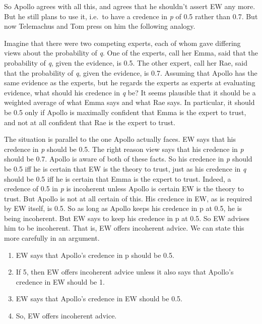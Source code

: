 \documentclass[
  10pt,
  letterpaper,
  DIV=11,
  numbers=noendperiod,
  twoside]{scrartcl}
\providecommand{\tightlist}{%
  \setlength{\itemsep}{0pt}\setlength{\parskip}{0pt}}\usepackage{longtable,booktabs,array}
\begin{document}
So Apollo agrees with all this, and agrees that he shouldn't assert EW
any more. But he still plans to use it, i.e.~to have a credence in
\emph{p} of 0.5 rather than 0.7. But now Telemachus and Tom press on him
the following analogy.

Imagine that there were two competing experts, each of whom gave
differing views about the probability of \emph{q}. One of the experts,
call her Emma, said that the probability of \emph{q}, given the
evidence, is 0.5. The other expert, call her Rae, said that the
probability of \emph{q}, given the evidence, is 0.7. Assuming that
Apollo has the same evidence as the experts, but he regards the experts
as experts at evaluating evidence, what should his credence in \emph{q}
be? It seems plausible that it should be a weighted average of what Emma
says and what Rae says. In particular, it should be 0.5 only if Apollo
is maximally confident that Emma is the expert to trust, and not at all
confident that Rae is the expert to trust.

The situation is parallel to the one Apollo actually faces. EW says that
his credence in \emph{p} should be 0.5. The right reason view says that
his credence in \emph{p} should be 0.7. Apollo is aware of both of these
facts. So his credence in \emph{p} should be 0.5 iff he is certain that
EW is the theory to trust, just as his credence in \emph{q} should be
0.5 iff he is certain that Emma is the expert to trust. Indeed, a
credence of 0.5 in \emph{p} is incoherent unless Apollo is certain EW is
the theory to trust. But Apollo is not at all certain of this. His
credence in EW, as is required by EW itself, is 0.5. So as long as
Apollo keeps his credence in p at 0.5, he is being incoherent. But EW
says to keep his credence in p at 0.5. So EW advises him to be
incoherent. That is, EW offers incoherent advice. We can state this more
carefully in an argument.

\begin{enumerate}
\def\labelenumi{\arabic{enumi}.}
\setcounter{enumi}{4}
\tightlist
\item
  EW says that Apollo's credence in p should be 0.5.
\item
  If 5, then EW offers incoherent advice unless it also says that
  Apollo's credence in EW should be 1.
\item
  EW says that Apollo's credence in EW should be 0.5.
\item
  So, EW offers incoherent advice.
\end{enumerate}
\end{document}

